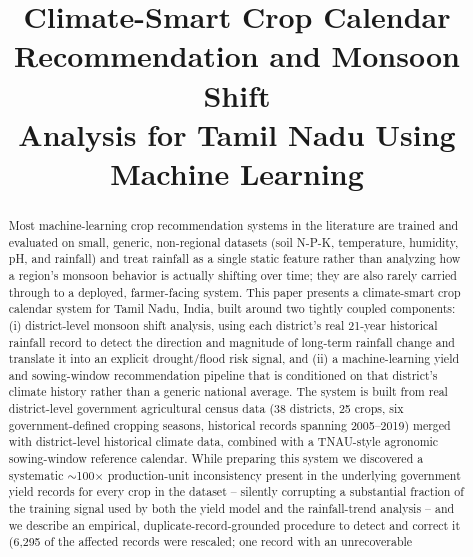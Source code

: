 \documentclass[conference]{IEEEtran}
\begin{document}
\title{Climate-Smart Crop Calendar Recommendation and Monsoon Shift\\
Analysis for Tamil Nadu Using Machine Learning}

\author{
}

\maketitle

\begin{abstract}
Most machine-learning crop recommendation systems in the literature are trained and
evaluated on small, generic, non-regional datasets (soil N-P-K, temperature, humidity,
pH, and rainfall) and treat rainfall as a single static feature rather than analyzing
how a region's monsoon behavior is actually shifting over time; they are also rarely
carried through to a deployed, farmer-facing system. This paper presents a
climate-smart crop calendar system for Tamil Nadu, India, built around two tightly
coupled components: (i) district-level monsoon shift analysis, using each district's
real 21-year historical rainfall record to detect the direction and magnitude of
long-term rainfall change and translate it into an explicit drought/flood risk
signal, and (ii) a machine-learning yield and sowing-window recommendation pipeline
that is conditioned on that district's climate history rather than a generic
national average. The system is built from real district-level government
agricultural census data (38 districts, 25 crops, six government-defined cropping
seasons, historical records spanning 2005--2019) merged with district-level
historical climate data, combined with a TNAU-style agronomic sowing-window reference
calendar. While preparing this system we discovered a systematic $\sim$100$\times$
production-unit inconsistency present in the underlying government yield records for
every crop in the dataset -- silently corrupting a substantial fraction of the
training signal used by both the yield model and the rainfall-trend analysis -- and
we describe an empirical, duplicate-record-grounded procedure to detect and correct
it (6{,}295 of the affected records were rescaled; one record with an unrecoverable

\end{abstract}
\end{document}
